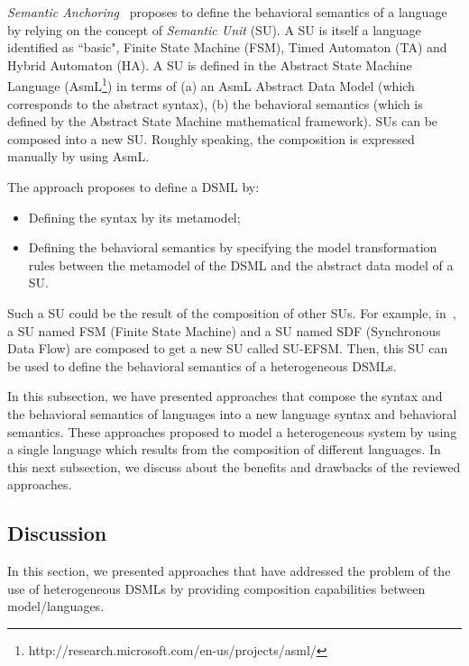 \emph{Semantic Anchoring}~\cite{semanticsanchoring} proposes to define the behavioral semantics of a language by relying on the concept of \emph{Semantic Unit} (SU). A SU is itself a language identified as ``basic", \eg Finite State Machine (FSM), Timed Automaton (TA) and Hybrid Automaton (HA). A SU is defined in the Abstract State Machine Language (AsmL\footnote{http://research.microsoft.com/en-us/projects/asml/}) in terms of (a) an AsmL Abstract Data Model (which corresponds to the abstract syntax), (b) the behavioral semantics (which is defined by the Abstract State Machine mathematical framework). SUs can be composed into a new SU. Roughly speaking, the composition is expressed manually by using AsmL. 

The approach proposes to define a DSML by:
\begin{itemize}
	\item Defining the syntax by its metamodel; 
	\item Defining the behavioral semantics by specifying the model transformation rules between the metamodel of the DSML and the abstract data model of a SU.   
\end{itemize}
Such a SU could be the result of the composition of other SUs. For example, in~\cite{composemanticanch}, a SU named FSM (Finite State Machine) and a SU named SDF (Synchronous Data Flow) are composed to get a new SU called SU-EFSM. Then, this SU can be used to define the behavioral semantics of a heterogeneous DSMLs.

In this subsection, we have presented approaches that compose the syntax and the behavioral semantics of languages into a new language syntax and behavioral semantics. These approaches proposed to model a heterogeneous system by using a single language which results from the composition of different languages. In this next subsection, we discuss about the benefits and drawbacks of the reviewed approaches.

\subsection{Discussion}
In this section, we presented approaches that have addressed the problem of the use of heterogeneous DSMLs by providing composition capabilities between model/languages.

